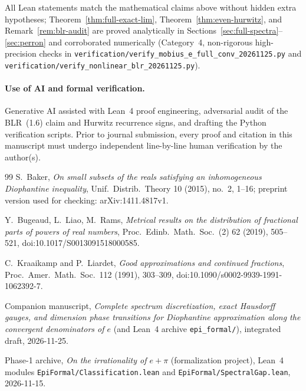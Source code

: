 \documentclass[11pt]{article}
\theoremstyle{definition}
\theoremstyle{remark}
\begin{document}
All Lean statements match the mathematical claims above without hidden extra
hypotheses; Theorem~\ref{thm:full-exact-lim}, Theorem~\ref{thm:even-hurwitz},
and Remark~\ref{rem:blr-audit} are proved analytically in Sections~\ref{sec:full-spectra}--\ref{sec:perron}
and corroborated numerically (Category~4, non-rigorous high-precision checks in
\texttt{verification/\allowbreak verify\_\allowbreak mobius\_\allowbreak e\_\allowbreak full\_\allowbreak conv\_\allowbreak 20261125.py}
and \texttt{verification/\allowbreak verify\_\allowbreak nonlinear\_\allowbreak blr\_\allowbreak 20261125.py}).

\paragraph{Use of AI and formal verification.}
Generative AI assisted with Lean~4 proof engineering, adversarial audit of the
BLR~(1.6) claim and Hurwitz recurrence signs, and drafting the Python verification
scripts.
Prior to journal submission, every proof and citation in this manuscript must
undergo independent line-by-line human verification by the author(s).

\begin{thebibliography}{99}
 S.~Baker, \emph{On small subsets of the reals satisfying an
inhomogeneous Diophantine inequality}, Unif.\ Distrib.\ Theory 10 (2015), no.~2,
1--16; preprint version used for checking: arXiv:1411.4817v1.

{\sloppy
{} Y.~Bugeaud, L.~Liao, M.~Rams, \emph{Metrical results on the
distribution of fractional parts of powers of real numbers}, Proc.\ Edinb.\ Math.\
Soc.\ (2) 62 (2019), 505--521, doi:10.1017/S0013091518000585.
}

{\sloppy
{} C.~Kraaikamp and P.~Liardet, \emph{Good approximations and
continued fractions}, Proc.\ Amer.\ Math.\ Soc.\ 112 (1991), 303--309,
doi:10.1090/s0002-9939-1991-1062392-7.
}

 Companion manuscript, \emph{Complete spectrum discretization,
exact Hausdorff gauges, and dimension phase transitions for Diophantine
approximation along the convergent denominators of $e$} (and Lean~4 archive
\texttt{epi\_formal/}), integrated draft, 2026-11-25.

 Phase-1 archive, \emph{On the irrationality of $e+\pi$}
(formalization project), Lean~4 modules \texttt{EpiFormal/\allowbreak Classification.lean}
and \texttt{EpiFormal/\allowbreak Spectral\allowbreak Gap.lean}, 2026-11-15.
\end{thebibliography}
\end{document}
